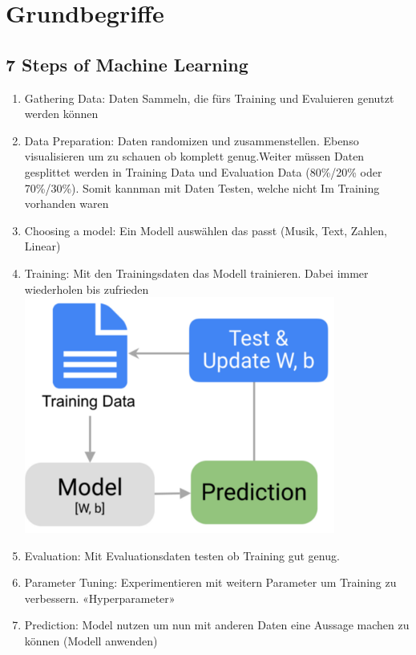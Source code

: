 \section{Grundbegriffe}
\subsection{7 Steps of Machine Learning}
\begin{enumerate}
\item Gathering Data: Daten Sammeln, die fürs Training und Evaluieren genutzt werden können
\item Data Preparation: Daten randomizen und zusammenstellen. Ebenso visualisieren um zu schauen ob komplett genug.Weiter müssen Daten gesplittet werden in Training Data und Evaluation Data (80\%/20\% oder 70\%/30\%). Somit kannman mit Daten Testen, welche nicht Im Training vorhanden waren
\item Choosing a model: Ein Modell auswählen das passt (Musik, Text, Zahlen, Linear)
\item Training: Mit den Trainingsdaten das Modell trainieren. Dabei immer wiederholen bis zufrieden
	\includegraphics[width=0.8\linewidth]{img/machine_learning_training.png}
\item Evaluation: Mit Evaluationsdaten testen ob Training gut genug.
\item Parameter Tuning: Experimentieren mit weitern Parameter um Training zu verbessern. «Hyperparameter»
\item Prediction: Model nutzen um nun mit anderen Daten eine Aussage machen zu können (Modell anwenden)
\end{enumerate}

